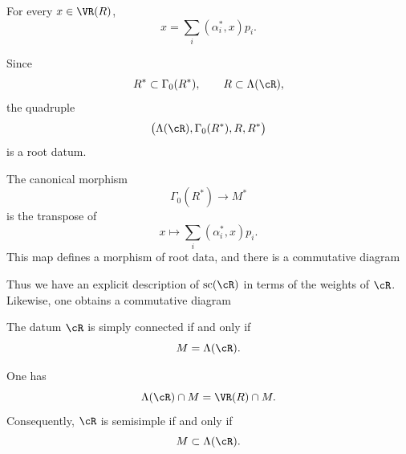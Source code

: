 \begin{corollary}\label{sga3:XXI:6.6.5}
For every \(x\in\VR(R)\),
\[
 x=\sum_i(\alpha_i^\ast,x)p_i.
\]
\end{corollary}

Since
\[
 R^\ast\subset\Gamma_0(R^\ast),
 \qquad
 R\subset\Lambda(\cR),
\]
the quadruple
\[
 \bigl(\Lambda(\cR),\Gamma_0(R^\ast),R,R^\ast\bigr)
\]
is a root datum.

\begin{corollary}\label{sga3:XXI:6.6.6}
The canonical morphism
\[
 \Gamma_0(R^\ast)\longrightarrow M^\ast
\]
is the transpose of
\[
 x\longmapsto\sum_i(\alpha_i^\ast,x)p_i.
\]
This map defines a morphism of root data, and there is a commutative
diagram
\begin{center}
\end{center}
\end{corollary}


Thus we have an explicit description of \(\operatorname{sc}(\cR)\)
in terms of the weights of \(\cR\). Likewise, one obtains a
commutative diagram
\begin{center}
\end{center}

\begin{corollary}\label{sga3:XXI:6.6.7}
The datum \(\cR\) is simply connected if and only if
\[
 M=\Lambda(\cR).
\]
\end{corollary}

\begin{remark}\label{sga3:XXI:6.6.8}
One has
\[
 \Lambda(\cR)\cap M=\VR(R)\cap M.
\]
Consequently, \(\cR\) is semisimple if and only if
\[
 M\subset\Lambda(\cR).
\]
\end{remark}

